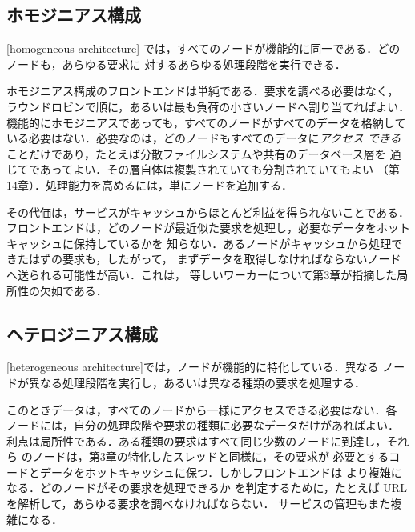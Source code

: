 \documentclass[../main.tex]{subfiles}
\begin{document}
\subsection{ホモジニアス構成}

\begin{definition}[ホモジニアス構成]
  [homogeneous architecture]
  では，すべてのノードが機能的に同一である．どのノードも，あらゆる要求に
  対するあらゆる処理段階を実行できる．
\end{definition}

ホモジニアス構成のフロントエンドは単純である．要求を調べる必要はなく，
ラウンドロビンで順に，あるいは最も負荷の小さいノードへ割り当てればよい．
機能的にホモジニアスであっても，すべてのノードがすべてのデータを格納して
いる必要はない．必要なのは，どのノードもすべてのデータに\emph{アクセス
できる}ことだけであり，たとえば分散ファイルシステムや共有のデータベース層を
通じてであってよい．その層自体は複製されていても分割されていてもよい
（第14章）．処理能力を高めるには，単にノードを追加する．

その代価は，サービスがキャッシュからほとんど利益を得られないことである．
フロントエンドは，どのノードが最近似た要求を処理し，必要なデータをホット
キャッシュに保持しているかを
知らない．あるノードがキャッシュから処理できたはずの要求も，したがって，
まずデータを取得しなければならないノードへ送られる可能性が高い．これは，
等しいワーカーについて第3章が指摘した局所性の欠如である．

\subsection{ヘテロジニアス構成}

\begin{definition}[ヘテロジニアス構成]
  [heterogeneous architecture]では，ノードが機能的に特化している．異なる
  ノードが異なる処理段階を実行し，あるいは異なる種類の要求を処理する．
\end{definition}

このときデータは，すべてのノードから一様にアクセスできる必要はない．各
ノードには，自分の処理段階や要求の種類に必要なデータだけがあればよい．
利点は局所性である．ある種類の要求はすべて同じ少数のノードに到達し，それら
のノードは，第3章の特化したスレッドと同様に，その要求が
必要とするコードとデータをホットキャッシュに保つ．しかしフロントエンドは
より複雑になる．どのノードがその要求を処理できるか
を判定するために，たとえば URL を解析して，あらゆる要求を調べなければならない．
サービスの管理もまた複雑になる．
\end{document}
